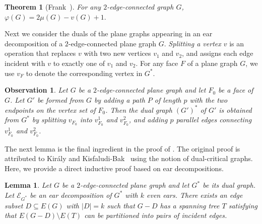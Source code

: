 \documentclass[a4paper,12pt]{article}
\theoremstyle{plain}
\newtheorem{theorem}{Theorem}[section]
\newtheorem{lemma}[lemma]{Lemma}
\newtheorem{observation}[observation]{Observation}
\theoremstyle{definition}
\theoremstyle{remark}
\numberwithin{equation}{section}
\begin{document}
\begin{theorem}[Frank~\cite{F1993}]\label{thm:frank}
For any $2$-edge-connected graph $G$, $\varphi(G)=2\mu(G)-v(G)+1.$
\end{theorem}

Next we consider the duals of the plane graphs appearing in an ear decomposition of a $2$-edge-connected plane graph $G$.
\emph{Splitting a vertex $v$} is an operation that replaces $v$ with two new vertices $v_1$ and $v_2$, and assigns each edge incident with $v$ to exactly one of $v_1$ and $v_2$. For any face $F$ of a plane graph $G$, we use $v_F$ to denote the corresponding vertex in $G^*$. 


\begin{observation}\label{obs:addear}
Let $G$ be a $2$-edge-connected plane graph and let $F_0$ be a face of $G$. Let $G'$ be formed from $G$ by adding a path $P$ of length $p$ with the two endpoints on the vertex set of $F_0$. Then the dual graph $(G')^*$ of $G'$ is obtained from $G^*$ by splitting $v_{F_0}$ into $v^1_{F_0}$ and $v^2_{F_0}$, and adding $p$ parallel edges connecting $v^1_{F_0}$ and $v^2_{F_0}$.
\end{observation}

The next lemma is the final ingredient in the proof of . The original proof is attributed to Kir\'aly and Kisfaludi-Bak~\cite{KK2012} using the notion of dual-critical graphs. Here, we provide a direct inductive proof based on ear decompositions.

\begin{lemma}\label{lem:key}
Let $G$ be a $2$-edge-connected plane graph and let $G^*$ be its dual graph.  Let $\mathcal{E}_{G^*}$ be an ear decomposition of $G^*$ with $k$ even ears. There exists an edge subset $D\subseteq E(G)$ with $|D|=k$ such that $G-D$ has a spanning tree $T$ satisfying that $E(G-D)\setminus E(T)$ can be partitioned into pairs of incident edges.
\end{lemma}
\end{document}
